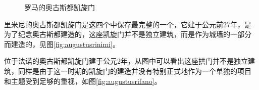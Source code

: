 \documentclass[a4paper,dvipdfm]{article}
\begin{document}
\begin{figure}[hbt!]
  \centering
  \caption{罗马的奥古斯都凯旋门}
\end{figure}

里米尼的奥古斯都凯旋门是这四个中保存最完整的一个，它建于公元前27年，是
为了纪念奥古斯都建造的，这座凯旋门并不是独立建筑，而是作为城墙的一部分
而建造的，见图\ref{fig:augustusrinimi}。

位于法诺的奥古斯都凯旋门建于公元2年，从图中可以看出这座拱门并不是独立建
筑，同样是由于这一时期的凯旋门的建造并没有特别正式地作为一个单独的项目
和主题受到足够的重视，如图\ref{fig:augustusrifano}。
\end{document}
